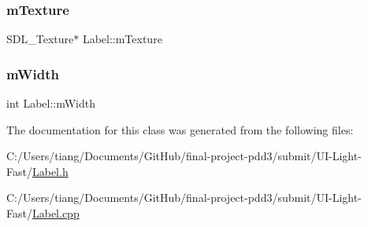 \subsubsection{\texorpdfstring{m\+Texture}{mTexture}}
{\footnotesize\ttfamily S\+D\+L\+\_\+\+Texture$\ast$ Label\+::m\+Texture\hspace{0.3cm}{\ttfamily [private]}}

\mbox{\label{class_label_a1e3446cc442a467c36ed539a2e4184a0}} 
\subsubsection{\texorpdfstring{m\+Width}{mWidth}}
{\footnotesize\ttfamily int Label\+::m\+Width\hspace{0.3cm}{\ttfamily [private]}}



The documentation for this class was generated from the following files\+:\begin{DoxyCompactItemize}
\item 
C\+:/\+Users/tiang/\+Documents/\+Git\+Hub/final-\/project-\/pdd3/submit/\+U\+I-\/\+Light-\/\+Fast/\mbox{\hyperlink{_label_8h}{Label.\+h}}\item 
C\+:/\+Users/tiang/\+Documents/\+Git\+Hub/final-\/project-\/pdd3/submit/\+U\+I-\/\+Light-\/\+Fast/\mbox{\hyperlink{_label_8cpp}{Label.\+cpp}}\end{DoxyCompactItemize}
